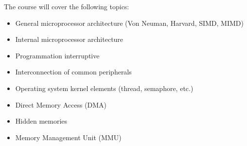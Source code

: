 The course will cover the following topics:
\begin{itemize}
    \item General microprocessor architecture (Von Neuman, Harvard, SIMD, MIMD)
    \item Internal microprocessor architecture
    \item Programmation interruptive
    \item Interconnection of common peripherals
    \item Operating system kernel elements (thread, semaphore, etc.)
    \item Direct Memory Access (DMA)
    \item Hidden memories
    \item Memory Management Unit (MMU)
\end{itemize}